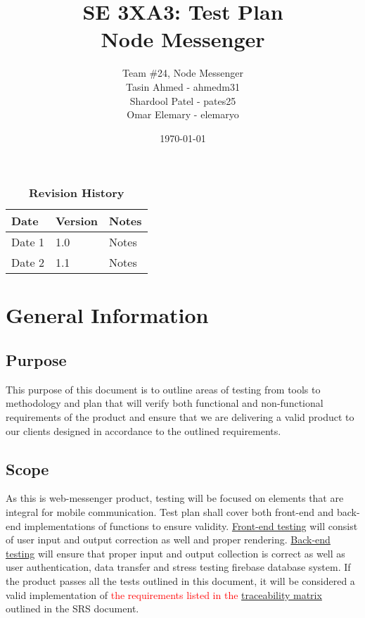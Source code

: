 \documentclass[12pt, titlepage]{article}
\title{SE 3XA3: Test Plan\\Node Messenger}
\author{Team \#24, Node Messenger
		\\ Tasin Ahmed - ahmedm31
		\\ Shardool Patel - pates25
		\\ Omar Elemary - elemaryo
}
\date{\today}
\begin{document}
\maketitle

\tableofcontents
\listoftables
\listoffigures

\begin{table}[bp]
\caption{\bf Revision History}
\begin{tabularx}{\textwidth}{p{3cm}p{2cm}X}
\toprule {\bf Date} & {\bf Version} & {\bf Notes}\\
\midrule
Date 1 & 1.0 & Notes\\
Date 2 & 1.1 & Notes\\
\bottomrule
\end{tabularx}
\end{table}

\newpage


\section{General Information}


\subsection{Purpose}
This purpose of this document is to outline areas of testing from tools to methodology and plan that will verify both functional and non-functional requirements of the product and ensure that we are delivering a valid product to our clients designed in accordance to the outlined requirements.
\subsection{Scope}
As this is web-messenger product, testing will be focused on elements that are integral for mobile communication. Test plan shall cover both front-end and back-end implementations of functions to ensure validity. \hyperref[sec:frontendtests]{Front-end testing} will consist of user input and output correction as well and proper rendering. \hyperref[sec:backendtests]{Back-end testing} will ensure that proper input and output collection is correct as well as user authentication, data transfer and stress testing firebase database system. If the product passes all the tests outlined in this document, it will be considered a valid implementation of \textcolor{red}{the requirements listed in the \hyperref[sec:tmatrix]{traceability matrix}} outlined in the SRS document. 
\end{document}
